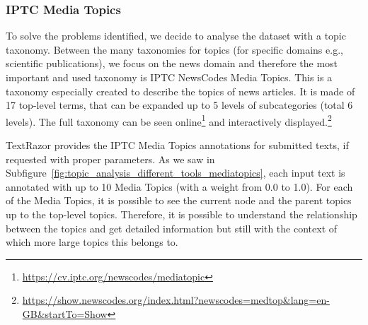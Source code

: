 



\subsubsection{\statusgreen IPTC Media Topics}

To solve the problems identified, %
we decide to analyse the dataset with a topic taxonomy.
Between the many taxonomies for topics (for specific domains e.g., scientific publications\cite{vayansky2020review,churchill2022evolution}), we focus on the news domain and therefore the most important and used taxonomy is IPTC NewsCodes Media Topics.
This is a taxonomy especially created to describe the topics of news articles. It is made of 17 top-level terms, that can be expanded up to 5 levels of subcategories (total 6 levels).
The full taxonomy can be seen online\footnote{\url{https://cv.iptc.org/newscodes/mediatopic}} and interactively displayed.\footnote{\url{https://show.newscodes.org/index.html?newscodes=medtop&lang=en-GB&startTo=Show}}




TextRazor provides the IPTC Media Topics annotations for submitted texts, if requested with proper parameters.
As we saw in Subfigure~\ref{fig:topic_analysis_different_tools_mediatopics}, each input text is annotated with up to 10 Media Topics (with a weight from 0.0 to 1.0). For each of the Media Topics, it is possible to see the current node and the parent topics up to the top-level topics.
Therefore, it is possible to understand the relationship between the topics and get detailed information but still with the context of which more large topics this belongs to.


